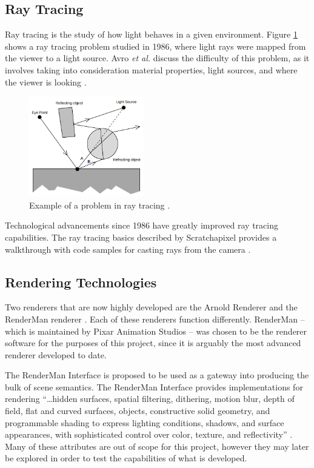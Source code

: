 \documentclass[conference]{IEEEtran}
\begin{document}
\subsection{Ray Tracing}
Ray tracing is the study of how light behaves in a given environment.
Figure \ref{fig:raytrace}
shows a ray tracing problem studied in 1986, where light rays were mapped from
the viewer to a light source. Avro \textit{et al.}
discuss the difficulty of this problem,
as it involves taking into consideration material properties, light sources,
and where the viewer is looking \cite{backwards_raytrace}.

\begin{figure}[htbp]
\centerline{\includegraphics[width=5cm]{raytrace.png}}
\caption{Example of a problem in ray tracing \cite{backwards_raytrace}.}
\label{fig:raytrace}
\end{figure}

Technological advancements since 1986 have greatly improved ray tracing capabilities.
The ray tracing basics described by Scratchapixel 
provides a walkthrough with code samples for casting rays from the camera
\cite{raytrace_walkthrough}.

\subsection{Rendering Technologies}
Two renderers that are now highly developed are the Arnold Renderer \cite{arnold}
and the RenderMan renderer \cite{renderman}. Each of these renderers
function differently.
RenderMan -- which is maintained by Pixar Animation Studios --
was chosen to be the renderer software for the purposes of this project,
since it is arguably the most advanced renderer developed to date.

The RenderMan Interface is proposed to be used as a gateway
into producing the bulk of scene semantics.
The RenderMan Interface provides implementations for rendering
``\dots hidden surfaces, spatial filtering, dithering, motion blur, depth of field,
flat and curved surfaces, objects, constructive solid geometry,
and programmable shading to express lighting conditions, shadows, and surface appearances,
with sophisticated control over color, texture, and reflectivity''
\cite{renderman_docs}.
Many of these attributes are out of scope
for this project, however they may later be explored in order to test the capabilities
of what is developed.
\end{document}
